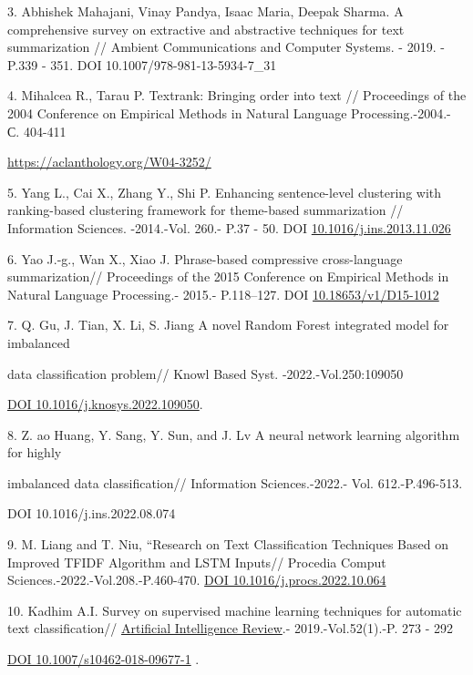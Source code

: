 3. Abhishek Mahajani, Vinay Pandya, Isaac Maria, Deepak Sharma. A
comprehensive survey on extractive and abstractive techniques for text
summarization // Ambient Communications and Computer Systems. - 2019. -
P.339 - 351. DOI 10.1007/978-981-13-5934-7\_31

4. Mihalcea R., Tarau P. Textrank: Bringing order into text //
Proceedings of the 2004 Conference on Empirical Methods in Natural
Language Processing.-2004.- С. 404-411

\url{https://aclanthology.org/W04-3252/}

5. Yang L., Cai X., Zhang Y., Shi P. Enhancing sentence-level clustering
with ranking-based clustering framework for theme-based summarization //
Information Sciences. -2014.-Vol. 260.- P.37 - 50. DOI
\href{http://dx.doi.org/10.1016/j.ins.2013.11.026}{10.1016/j.ins.2013.11.026}

6. Yao J.-g., Wan X., Xiao J. Phrase-based compressive cross-language
summarization// Proceedings of the 2015 Conference on Empirical Methods
in Natural Language Processing.- 2015.- P.118--127. DOI
\href{http://dx.doi.org/10.18653/v1/D15-1012}{10.18653/v1/D15-1012}

7. Q. Gu, J. Tian, X. Li, S. Jiang A novel Random Forest integrated
model for imbalanced

data classification problem// Knowl Based Syst. -2022.-Vol.250:109050

\href{https://doi.org/10.1016/j.knosys.2022.109050}{DOI
10.1016/j.knosys.2022.109050}.

8. Z. ao Huang, Y. Sang, Y. Sun, and J. Lv A neural network learning
algorithm for highly

imbalanced data classification// Information Sciences.-2022.- Vol.
612.-P.496-513.

DOI 10.1016/j.ins.2022.08.074

9. M. Liang and T. Niu, ``Research on Text Classification Techniques
Based on Improved TFIDF Algorithm and LSTM Inputs// Procedia Comput
Sciences.-2022.-Vol.208.-P.460-470.
\href{https://doi.org/10.1016/j.procs.2022.10.064}{DOI
10.1016/j.procs.2022.10.064}

10. Kadhim A.I. Survey on supervised machine learning techniques for
automatic text classification//
\href{https://www.researchgate.net/journal/Artificial-Intelligence-Review-1573-7462?_tp=eyJjb250ZXh0Ijp7ImZpcnN0UGFnZSI6InB1YmxpY2F0aW9uIiwicGFnZSI6InB1YmxpY2F0aW9uIn19}{Artificial
Intelligence Review}.- 2019.-Vol.52(1).-P. 273 - 292

\href{https://doi.org/10.1007/s10462-018-09677-1}{DOI
10.1007/s10462-018-09677-1} .

